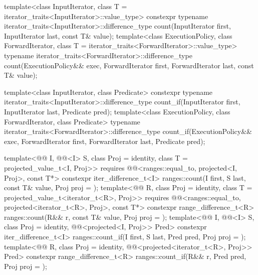 %
%
\begin{itemdecl}
template<class InputIterator, class T = iterator_traits<InputIterator>::value_type>
  constexpr typename iterator_traits<InputIterator>::difference_type
    count(InputIterator first, InputIterator last, const T& value);
template<class ExecutionPolicy, class ForwardIterator,
         class T = iterator_traits<ForwardIterator>::value_type>
  typename iterator_traits<ForwardIterator>::difference_type
    count(ExecutionPolicy&& exec,
          ForwardIterator first, ForwardIterator last, const T& value);

template<class InputIterator, class Predicate>
  constexpr typename iterator_traits<InputIterator>::difference_type
    count_if(InputIterator first, InputIterator last, Predicate pred);
template<class ExecutionPolicy, class ForwardIterator, class Predicate>
  typename iterator_traits<ForwardIterator>::difference_type
    count_if(ExecutionPolicy&& exec,
             ForwardIterator first, ForwardIterator last, Predicate pred);

template<@@ I, @@<I> S, class Proj = identity,
         class T = projected_value_t<I, Proj>>
  requires @@<ranges::equal_to, projected<I, Proj>, const T*>
  constexpr iter_difference_t<I>
    ranges::count(I first, S last, const T& value, Proj proj = {});
template<@@ R, class Proj = identity, class T = projected_value_t<iterator_t<R>, Proj>>
  requires @@<ranges::equal_to, projected<iterator_t<R>, Proj>, const T*>
  constexpr range_difference_t<R>
    ranges::count(R&& r, const T& value, Proj proj = {});
template<@@ I, @@<I> S, class Proj = identity,
         @@<projected<I, Proj>> Pred>
  constexpr iter_difference_t<I>
    ranges::count_if(I first, S last, Pred pred, Proj proj = {});
template<@@ R, class Proj = identity,
         @@<projected<iterator_t<R>, Proj>> Pred>
  constexpr range_difference_t<R>
    ranges::count_if(R&& r, Pred pred, Proj proj = {});
\end{itemdecl}

